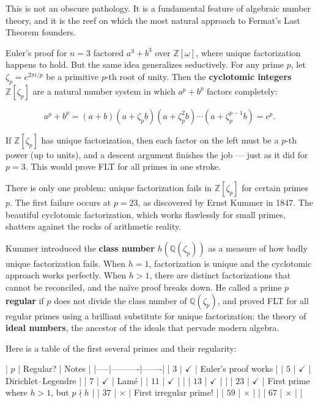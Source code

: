 \documentclass[11pt,openright,twoside]{book}
\theoremstyle{definition}
\begin{document}
This is not an obscure pathology. It is a fundamental feature of algebraic number theory, and it is the reef on which the most natural approach to Fermat's Last Theorem founders.

Euler's proof for $n = 3$ factored $a^3 + b^3$ over $\mathbb{Z}[\omega]$, where unique factorization happens to hold. But the same idea generalizes seductively. For any prime $p$, let $\zeta_p = e^{2\pi i/p}$ be a primitive $p$-th root of unity. Then the \textbf{cyclotomic integers} $\mathbb{Z}[\zeta_p]$ are a natural number system in which $a^p + b^p$ factors completely:

\[a^p + b^p = (a + b)(a + \zeta_p b)(a + \zeta_p^2 b) \cdots (a + \zeta_p^{p-1} b) = c^p.\]

If $\mathbb{Z}[\zeta_p]$ has unique factorization, then each factor on the left must be a $p$-th power (up to units), and a descent argument finishes the job --- just as it did for $p = 3$. This would prove FLT for all primes in one stroke.

There is only one problem: unique factorization fails in $\mathbb{Z}[\zeta_p]$ for certain primes $p$. The first failure occurs at $p = 23$, as discovered by Ernst Kummer in 1847. The beautiful cyclotomic factorization, which works flawlessly for small primes, shatters against the rocks of arithmetic reality.

Kummer introduced the \textbf{class number} $h(\mathbb{Q}(\zeta_p))$ as a measure of how badly unique factorization fails. When $h = 1$, factorization is unique and the cyclotomic approach works perfectly. When $h > 1$, there are distinct factorizations that cannot be reconciled, and the na\"ive proof breaks down. He called a prime $p$ \textbf{regular} if $p$ does not divide the class number of $\mathbb{Q}(\zeta_p)$, and proved FLT for all regular primes using a brilliant substitute for unique factorization: the theory of \textbf{ideal numbers}, the ancestor of the ideals that pervade modern algebra.

Here is a table of the first several primes and their regularity:

| $p$ | Regular? | Notes |
|-----|----------|-------|
| $3$ | {$\checkmark$} | Euler's proof works |
| $5$ | {$\checkmark$} | Dirichlet--Legendre |
| $7$ | {$\checkmark$} | Lamé |
| $11$ | {$\checkmark$} | |
| $13$ | {$\checkmark$} | |
| $23$ | {$\checkmark$} | First prime where $h > 1$, but $p \nmid h$ |
| $37$ | {$\times$} | First irregular prime! |
| $59$ | {$\times$} | |
| $67$ | {$\times$} | |
\end{document}
